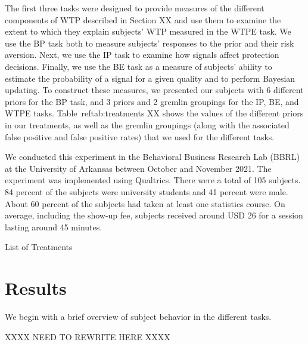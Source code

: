 \documentclass[12pt,a4paper]{article}
\begin{document}
The first three tasks were designed to provide measures of the different components of WTP described in Section XX and use them to examine the extent to which they explain subjects’ WTP measured in the WTPE task. We use the BP task both to measure subjects’ responses to the prior and their risk aversion. Next, we use the IP task to examine how signals affect protection decisions. Finally, we use the BE task as a measure of subjects’ ability to estimate the probability of a signal for a given quality and to perform Bayesian updating. To construct these measures, we presented our subjects with 6 different priors for the BP task, and 3 priors and 2 gremlin groupings for the IP, BE, and WTPE tasks. Table~ref{tab:treatments} XX shows the values of the different priors in our treatments, as well as the gremlin groupings (along with the associated false positive and false positive rates) that we used for the different tasks.

We conducted this experiment in the Behavioral Business Research Lab (BBRL) at the University of Arkansas between October and November 2021.  The experiment was implemented using Qualtrics. There were a total of 105 subjects. 84 percent of the subjects were university students and 41 percent were male.  About 60 percent of the subjects had taken at least one statistics course. On average, including the show-up fee, subjects received around USD 26 for a session lasting around 45 minutes.  




\begin{table}[h!]
\caption{List of Treatments} \label{tab:treatments}

\end{table}







\vspace{20pt}
\section{Results}\label{sec:results}
We begin with a brief overview of subject behavior in the different tasks. 

XXXX NEED TO REWRITE HERE XXXX
\end{document}
